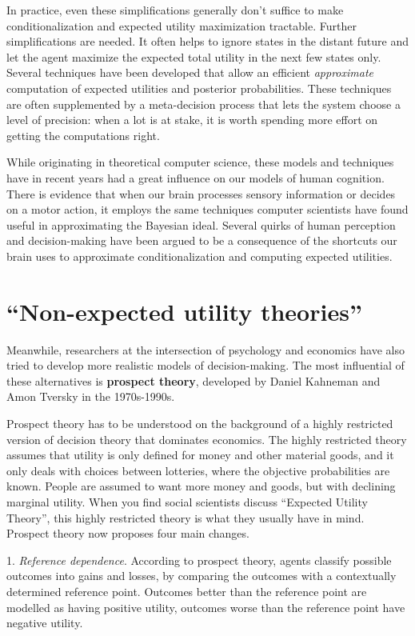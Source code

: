 In practice, even these simplifications generally don't suffice to make
conditionalization and expected utility maximization tractable. Further
simplifications are needed. It often helps to ignore states in the distant
future and let the agent maximize the expected total utility in the next few
states only. Several techniques have been developed that allow an efficient
\emph{approximate} computation of expected utilities and posterior
probabilities. These techniques are often supplemented by a meta-decision
process that lets the system choose a level of precision: when a lot is at
stake, it is worth spending more effort on getting the computations right.

While originating in theoretical computer science, these models and techniques
have in recent years had a great influence on our models of human cognition.
There is evidence that when our brain processes sensory information or decides
on a motor action, it employs the same techniques computer scientists have found
useful in approximating the Bayesian ideal. Several quirks of human perception
and decision-making have been argued to be a consequence of the shortcuts our
brain uses to approximate conditionalization and computing expected utilities.


\section{``Non-expected utility theories''}\label{sec:prospect-theory}

Meanwhile, researchers at the intersection of psychology and economics have also
tried to develop more realistic models of decision-making. The most influential
of these alternatives is \textbf{prospect theory}, developed by Daniel Kahneman
and Amon Tversky in the 1970s-1990s.

Prospect theory has to be understood on the background of a highly restricted
version of decision theory that dominates economics. The highly restricted
theory assumes that utility is only defined for money and other material goods,
and it only deals with choices between lotteries, where the objective
probabilities are known. People are assumed to want more money and goods, but
with declining marginal utility. When you find social scientists discuss
``Expected Utility Theory'', this highly restricted theory is what they usually
have in mind. Prospect theory now proposes four main changes.

1. \emph{Reference dependence}. According to prospect theory, agents classify
possible outcomes into gains and losses, by comparing the outcomes with a
contextually determined reference point. Outcomes better than the reference
point are modelled as having positive utility, outcomes worse than the reference
point have negative utility.

